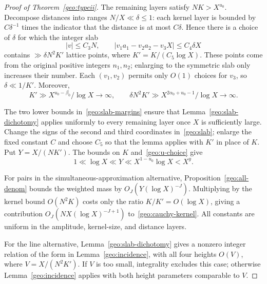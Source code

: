 \documentclass[11pt,a4paper]{article}
\theoremstyle{paperplain}
\numberwithin{equation}{section}
\begin{document}
\begin{proof}[Proof of Theorem~\ref{geo:typeii}]
The remaining layers satisfy $NK>X^{u_0}$.
Decompose distances into ranges $N/X\ll\delta\le1$:
each kernel layer is bounded by $C\delta^{-1}$ times the indicator that the
distance is at most $C\delta$.
Hence there is a choice of $\delta$ for which the integer slab
\begin{equation}\label{geo:slab}
 |v|\le C_3N,\qquad
 |v_1a_1-v_2a_2-v_3X|\le C_4\delta X
\end{equation}
contains $\gg\delta N^2K'$ lattice points, where
$K'=K/(C_5\log X)$.
These points come from the original positive integers $n_1,n_2$;
enlarging to the symmetric slab only increases their number.
Each $(v_1,v_2)$ permits only $O(1)$ choices for $v_3$, so
$\delta\ll1/K'$.
Moreover,
\begin{equation}\label{geo:slab-margins}
 K'\gg X^{u_0-\beta_0}/\log X\longrightarrow\infty,
 \qquad
 \delta N^2K'\gg X^{2\alpha_0+u_0-1}/\log X\longrightarrow\infty.
\end{equation}

The two lower bounds in~\eqref{geo:slab-margins} ensure that
Lemma~\ref{geo:slab-dichotomy} applies uniformly to every remaining
layer once $X$ is sufficiently large. Change the signs of the second
and third coordinates in~\eqref{geo:slab}; enlarge the fixed constant $C$
and choose $C_5$ so that the lemma applies with $K'$ in place of $K$.
Put $Y=X/(NK')$. The bounds on $K$ and~\eqref{geo:u-choice} give
\[
 1\ll\log X\ll Y\ll X^{1-u_0}\log X<X^y.
\]

For pairs in the simultaneous-approximation alternative,
Proposition~\ref{geo:all-denom} bounds the weighted mass by
$O_J(Y(\log X)^{-J})$.
Multiplying by the kernel bound $O(N^2K)$ costs only the ratio
$K/K'=O(\log X)$, giving a contribution
$O_J(NX(\log X)^{-J+1})$ to~\eqref{geo:cauchy-kernel}.
All constants are uniform in the amplitude, kernel-size, and distance layers.

For the line alternative, Lemma~\ref{geo:slab-dichotomy} gives a nonzero
integer relation of the form in Lemma~\ref{geo:incidence}, with all four
heights $O(V)$, where $V=X/(N^2K')$.
If $V$ is too small, integrality excludes this case; otherwise
Lemma~\ref{geo:incidence} applies with both height parameters comparable
to $V$.


\end{proof}
\end{document}
